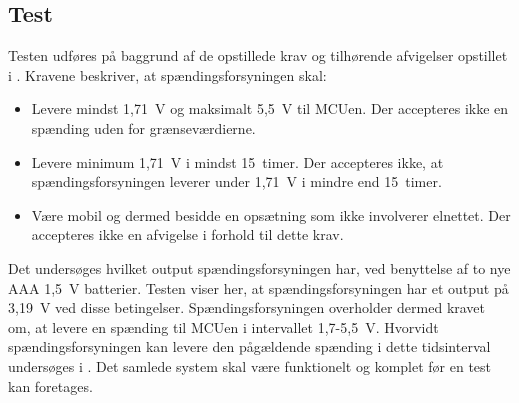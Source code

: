 \subsection{Test} 
Testen udføres på baggrund af de opstillede krav og tilhørende afvigelser opstillet i . Kravene beskriver, at spændingsforsyningen skal:
\begin{itemize}
	\item Levere mindst 1,71~V og maksimalt 5,5~V til MCUen. Der accepteres ikke en spænding uden for grænseværdierne.
	\item Levere minimum 1,71~V i mindst 15~timer. Der accepteres ikke, at spændingsforsyningen leverer under 1,71~V i mindre end 15~timer.
	\item Være mobil og dermed besidde en opsætning som ikke involverer elnettet. Der accepteres ikke en afvigelse i forhold til dette krav.
\end{itemize}
Det undersøges hvilket output spændingsforsyningen har, ved benyttelse af to nye AAA 1,5~V batterier. Testen viser her, at spændingsforsyningen har et output på 3,19~V ved disse betingelser.\newline
Spændingsforsyningen overholder dermed kravet om, at levere en spænding til MCUen i intervallet 1,7-5,5~V. Hvorvidt spændingsforsyningen kan levere den pågældende spænding i dette tidsinterval undersøges i . Det samlede system skal være funktionelt og komplet før en test kan foretages.